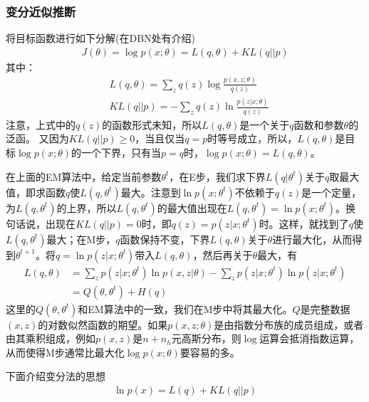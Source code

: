         \subsubsection{变分近似推断}
            \par
            将目标函数进行如下分解(在DBN处有介绍)
            \begin{align*}
            J(\theta) = \log p(x;\theta) = L(q,\theta) + KL(q||p)
            \end{align*}
            其中：
            \begin{align*}
            & L(q,\theta) = \sum_zq(z) \log \frac{p(x,z;\theta)}{q(z)}\\
            & KL(q||p) = -\sum_zq(z) \ln \frac{p(z|x;\theta)}{q(z)}
            \end{align*}
            注意，上式中的$q(z)$的函数形式未知，所以$L(q,\theta)$是一个关于$q$函数和参数$\theta$的泛函。
            又因为$KL(q||p) \geqslant 0$，当且仅当$q=p$时等号成立，所以，$L(q,\theta)$是目标$\log p(x;\theta)$的一个下界，只有当$p=q$时，$\log p(x;\theta)=L(q,\theta)$。
            \par
            在上面的EM算法中，给定当前参数$\theta^t$，在E步，我们求下界$L(q|\theta^t)$关于$q$取最大值，即求函数$q$使$L(q,\theta^t)$最大。注意到$\ln p(x;\theta^t)$不依赖于$q(z)$是一个定量，为$L(q,\theta^t)$的上界，所以$L(q,\theta^t)$的最大值出现在$L(q,\theta^t)= \ln p(x;\theta^t)$。换句话说，出现在$KL(q||p)=0$时，即$q(z) = p(z|x;\theta^t)$时。这样，就找到了$q$使$L(q,\theta^t)$最大；在M步，$q$函数保持不变，下界$L(q,\theta)$关于$\theta$进行最大化，从而得到$\theta^{t+1}$。将$q= \ln p(z|x;\theta^t)$带入$L(q,\theta)$，然后再关于$\theta$最大，有
            \begin{align*}
            L(q,\theta) &= \sum_zp(z|x;\theta^t)\ln p(x,z|\theta) - \sum_zp(z|x;\theta^t)\ln p(z|x;\theta^t)\\
            &=Q(\theta,\theta^t) + H(q)
            \end{align*}
            这里的$ Q(\theta,\theta^t)$和EM算法中的一致，我们在M步中将其最大化。$Q$是完整数据$(x,z)$的对数似然函数的期望。如果$p(x,z;\theta)$是由指数分布族的成员组成，或者由其乘积组成，例如$p(x,z)$是$n+n_h$元高斯分布，则$\log$运算会抵消指数运算，从而使得M步通常比最大化$\log p(x;\theta)$要容易的多。
            \par
            下面介绍变分法的思想
            \begin{align*}
            \ln p(x) = L(q)+KL(q|| p)
            \end{align*}
